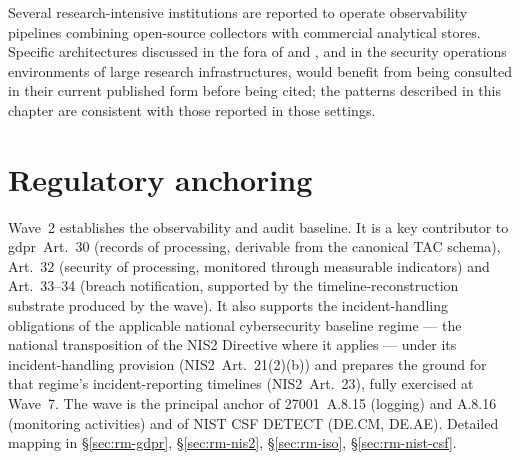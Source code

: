 \begin{realworldbox}
\noindent Several research-intensive institutions are reported to
operate observability pipelines combining open-source collectors
with commercial analytical stores. Specific architectures
discussed in the fora of  and , and
in the security operations environments of large research
infrastructures, would benefit from being consulted in their
current published form before being cited; the patterns described
in this chapter are consistent with those reported in those
settings.
\end{realworldbox}

\section{Regulatory anchoring}
\label{sec:w2-regulatory}

\noindent Wave~2 establishes the observability and audit
baseline. It is a key contributor to \gls{gdpr}~Art.~30 (records
of processing, derivable from the canonical TAC schema), Art.~32
(security of processing, monitored through measurable
indicators) and Art.~33--34 (breach notification, supported by
the timeline-reconstruction substrate produced by the wave). It
also supports the incident-handling obligations of the
applicable national cybersecurity baseline regime --- the
national transposition of the NIS2 Directive where it applies ---
under its incident-handling provision (NIS2~Art.~21(2)(b)) and
prepares the ground for that regime's incident-reporting
timelines (NIS2~Art.~23), fully exercised at Wave~7. The wave
is the principal anchor of
27001~A.8.15 (logging) and A.8.16 (monitoring activities) and
of NIST CSF \textsf{DETECT} (DE.CM, DE.AE). Detailed mapping in
 \S\ref{sec:rm-gdpr},
\S\ref{sec:rm-nis2}, \S\ref{sec:rm-iso},
\S\ref{sec:rm-nist-csf}.
